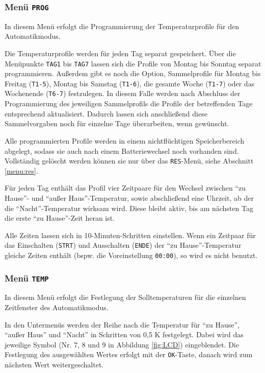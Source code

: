 \documentclass[a4paper]{article}
\begin{document}
\subsubsection {
  Menü \texttt{PROG}\label{menu:prog}
}

In diesem Menü erfolgt die Programmierung der Temperaturprofile für
den Automatikmodus.

Die Temperaturprofile werden für jeden Tag separat gespeichert.  Über
die Menüpunkte \texttt{TAG1} bis \texttt{TAG7} lassen sich die Profile
von Montag bis Sonntag separat programmieren.  Außerdem gibt es noch
die Option, Sammelprofile für Montag bis Freitag (\texttt{T1-5}),
Montag bis Samstag (\texttt{T1-6}), die gesamte Woche (\texttt{T1-7})
oder das Wochenende (\texttt{T6-7}) festzulegen.  In diesem Falle
werden nach Abschluss der Programmierung des jeweiligen Sammelprofils
die Profile der betreffenden Tage entsprechend aktualisiert.  Dadurch
lassen sich anschließend diese Sammelvorgaben noch für einzelne Tage
überarbeiten, wenn gewünscht.

Alle programmierten Profile werden in einem nichtflüchtigen
Speicherbereich abgelegt, sodass sie auch nach einem Batteriewechsel
noch vorhanden sind.  Vollständig gelöscht werden können sie nur über
das \texttt{RES}-Menü, siehe Abschnitt \ref{menu:res}.

Für jeden Tag enthält das Profil vier Zeitpaare für den Wechsel
zwischen "`zu Hause"'- und "`außer Haus"'-Temperatur, sowie
abschließend eine Uhrzeit, ab der die "`Nacht"'-Temperatur
wirksam wird.  Diese bleibt aktiv, bis am nächsten Tag die erste
"`zu Hause"'-Zeit heran ist.

Alle Zeiten lassen sich in 10-Minuten-Schritten einstellen.  Wenn ein
Zeitpaar für das Einschalten (\texttt{STRT}) und Ausschalten
(\texttt{ENDE}) der "`zu Hause"'-Temperatur gleiche Zeiten enthält
(bspw. die Voreinstellung \texttt{00:00}), so wird es nicht benutzt.

\subsubsection {
  Menü \texttt{TEMP}\label{menu:temp}
}

In diesem Menü erfolgt die Festlegung der Solltemperaturen für die
einzelnen Zeitfenster des Automatikmodus.

In den Untermenüs werden der Reihe nach die Temperatur für "`zu
Hause"', "`außer Haus"' und "`Nacht"' in Schritten von 0,5 K
festgelegt.  Dabei wird das jeweilige Symbol (Nr. 7, 8 und 9
in Abbildung \ref{fig:LCD}) eingeblendet.  Die Festlegung des
ausgewählten Wertes erfolgt mit der \texttt{OK}-Taste, danach
wird zum nächsten Wert weitergeschaltet.
\end{document}

